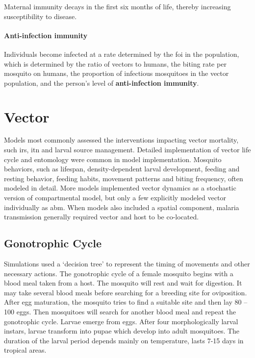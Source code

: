 \documentclass[a4paper, 12pt, twoside]{article}
\begin{document}
Maternal immunity decays in the first six months of life, thereby increasing susceptibility to disease.

\paragraph{Anti-infection immunity}
Individuals become infected at a rate determined by the \gls{foi} in the population, which is determined by the ratio of vectors to humans, the biting rate per mosquito on humans, the proportion of infectious mosquitoes in the vector population, and the person’s level of \textbf{anti-infection immunity}.



\section{Vector}%
\label{sec:vector}
Models most commonly assessed the interventions impacting vector mortality, such \gls{irs}, \gls{itn} and larval source management.
Detailed implementation of vector life cycle and entomology were common in model implementation.
Mosquito behaviors, such as lifespan, density-dependent larval development, feeding and resting behavior, feeding habits, movement patterns and biting frequency, often modeled in detail.
More models implemented vector dynamics as a stochastic version of compartmental model\cite{Sherrard-Smith2018b}, but only a few explicitly modeled vector individually as \gls{abm}. 
When models also included a spatial component, malaria transmission generally required vector and host to be co-located.

\subsection{Gonotrophic Cycle}
Simulations used a ‘decision tree’ to represent the timing of movements and other necessary actions.
The gonotrophic cycle of a female mosquito begins with a blood meal taken from a host.
The mosquito will rest and wait for digestion.
It may take several blood meals before searching for a breeding site for oviposition.
After egg maturation, the mosquito tries to find a suitable site and then lay 80 – 100 eggs.
Then mosquitoes will search for another blood meal and repeat the gonotrophic cycle.
Larvae emerge from eggs.
After four morphologically larval instars, larvae transform into pupae which develop into adult mosquitoes.
The duration of the larval period depends mainly on temperature, lasts 7-15 days in tropical areas.
\end{document}
